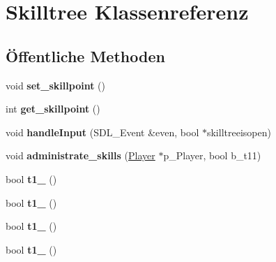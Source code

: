 \hypertarget{class_skilltree}{\section{Skilltree Klassenreferenz}
\label{class_skilltree}
}
\subsection*{Öffentliche Methoden}
\begin{DoxyCompactItemize}
\item 
\hypertarget{class_skilltree_ae70ee0539a4cf46685e0b16be65b2c6a}{void {\bfseries set\-\_\-skillpoint} ()}\label{class_skilltree_ae70ee0539a4cf46685e0b16be65b2c6a}

\item 
\hypertarget{class_skilltree_a00957d9725305806a2245746e5972252}{int {\bfseries get\-\_\-skillpoint} ()}\label{class_skilltree_a00957d9725305806a2245746e5972252}

\item 
\hypertarget{class_skilltree_ae60bd6e6d9ce06eed34f90284ceb0714}{void {\bfseries handle\-Input} (S\-D\-L\-\_\-\-Event \&even, bool $\ast$skilltreeisopen)}\label{class_skilltree_ae60bd6e6d9ce06eed34f90284ceb0714}

\item 
\hypertarget{class_skilltree_a582d9b59e84bcd1b3401241b3d748837}{void {\bfseries administrate\-\_\-skills} (\hyperlink{class_player}{Player} $\ast$p\-\_\-\-Player, bool b\-\_\-t11)}\label{class_skilltree_a582d9b59e84bcd1b3401241b3d748837}

\item 
\hypertarget{class_skilltree_aed683621d09de5536a39a5e7f6895b41}{bool {\bfseries t1\-\_} ()}\label{class_skilltree_aed683621d09de5536a39a5e7f6895b41}

\item 
\hypertarget{class_skilltree_ae0226fcc85365c85eb4ef88139c65df5}{bool {\bfseries t1\-\_} ()}\label{class_skilltree_ae0226fcc85365c85eb4ef88139c65df5}

\item 
\hypertarget{class_skilltree_af772b25271d2b1805bab39773041da82}{bool {\bfseries t1\-\_} ()}\label{class_skilltree_af772b25271d2b1805bab39773041da82}

\item 
\hypertarget{class_skilltree_a21f7aea9d771b8fffe9df9b517f0245f}{bool {\bfseries t1\-\_} ()}\label{class_skilltree_a21f7aea9d771b8fffe9df9b517f0245f}


\end{DoxyCompactItemize}
